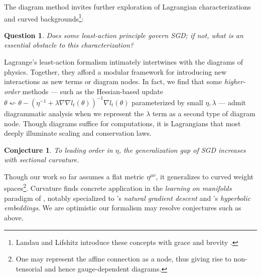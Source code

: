 \documentclass{article}
\theoremstyle{plain}
\newtheorem{conj}{Conjecture}
\newtheorem{quest}{Question}
\theoremstyle{definition}
\begin{document}

    The diagram method invites further exploration of Lagrangian
    characterizations and curved backgrounds\footnote{
        Landau and Lifshitz introduce these concepts with grace and brevity
        .
    }:
    \begin{quest}
        Does some least-action principle govern SGD; if not,
        what is an essential obstacle to this characterization?
    \end{quest}
        Lagrange's least-action formalism intimately intertwines with the
        diagrams of physics.  Together, they afford a modular framework for
        introducing new interactions as new terms or diagram nodes.  In fact,
        we find that some \emph{higher-order} methods --- such as the
        Hessian-based update
        $
            \theta \leftsquigarrow
            \theta -
            (\eta^{-1} + \lambda \nabla \nabla l_t(\theta))^{-1}
            \nabla l_t(\theta)
        $
        parameterized by small $\eta, \lambda$ --- admit diagrammatic analysis
        when we represent the $\lambda$ term as a second type of
        diagram node.  Though diagrams suffice for computations, it is
        Lagrangians that most deeply illuminate scaling and conservation laws.
    \begin{conj}
        To leading order in $\eta$, the generalization gap of SGD  
        increases with sectional curvature.
    \end{conj}
        Though our work so far assumes a flat metric $\eta^{\mu\nu}$, it 
        generalizes to curved weight spaces\footnote{
            One may represent the affine connection as a node, thus giving
            rise to non-tensorial and hence gauge-dependent diagrams.
        }.
        Curvature finds concrete application in the \emph{learning on
        manifolds} paradigm of \citet{bo13}, notably specialized to
        \citet{am98}'s \emph{natural gradient descent} and \citet{ni17}'s
        \emph{hyperbolic embeddings}.  We are optimistic our formalism may
        resolve conjectures such as above.

\end{document}
